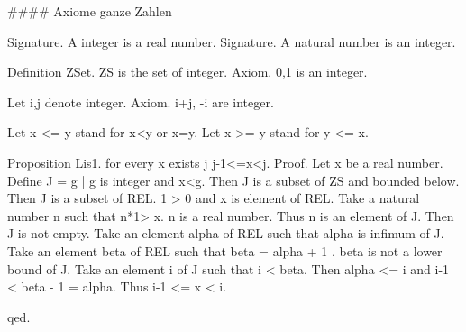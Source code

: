 \documentclass{article}
\newenvironment{forthel}{\begin{leftbar}}{\end{leftbar}}
\begin{document}
\begin{forthel}
#### Axiome ganze Zahlen

Signature. A integer is a real number.
Signature. A natural number is an integer.

Definition ZSet.
ZS is the set of integer.
Axiom. 0,1 is an integer.

Let i,j denote integer.
Axiom. i+j, -i are integer.

Let x <= y stand for x<y or x=y.
Let x >= y stand for y <= x.

Proposition Lis1. for every x exists j j-1<=x<j.
Proof.
Let x be a real number.
Define J = {g | g is integer and x<g}.
Then J is a subset of ZS and bounded below.
Then J is a subset of REL.
1 > 0 and x is element of REL.
Take a natural number n such that n*1> x.
n is a real number. Thus n is an element of J. Then J is not empty.
Take an element alpha of REL such that alpha is infimum of J.
Take an element beta of REL such that beta = alpha + 1 .
beta is not a lower bound of J.
Take an element i of J such that i < beta. Then  alpha <= i and i-1 < beta - 1 = alpha. Thus i-1 <= x < i.

qed.













\end{forthel}
\end{document}
